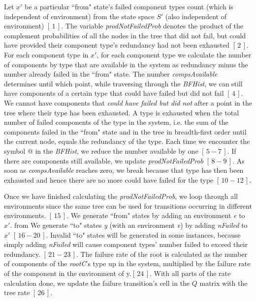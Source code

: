 \documentclass[12pt]{article}
\newcommand{\varName}[1]{\textrm{\it#1}}
\newcommand{\citeLine}[1]{$[\,#1\,]$}
\newcommand{\citeBlock}[2]{$[\,#1 - #2\,]$}
\begin{document}
Let $x'$ be a particular ``from" state's failed component types count (which is independent of environment) from the state space $S'$ (also independent of environment) \citeLine{1}. The variable \textit{prodNotFailedProb} denotes the product of the complement probabilities of all the nodes in the tree that did not fail, but could have provided their component type's redundancy had not been exhausted \citeLine{2}. For each component type in $x'$, for each component type we calculate the number of components by type that are available in the system as redundancy minus the number already failed in the ``from" state. The number \textit{compsAvailable} determines until which point, while traversing through the \textit{BFHist}, we can still have components of a certain type that could have failed but did not fail \citeLine{4}. We cannot have components that \textit{could have failed but did not} after a point in the tree where their type has been exhausted. A type is exhausted when the total number of failed components of the type in the system, i.e. the sum of the components failed in the ``from" state and in the tree in breadth-first order until the current node, equals the redundancy of the type. Each time we encounter the symbol @ in the \textit{BFHist}, we reduce the number available by one \citeBlock{5}{7}. If there are components still available, we update \textit{prodNotFailedProb} \citeBlock{8}{9}. As soon as \textit{compsAvailable} reaches zero, we break because that type has then been exhausted and hence there are no more could have failed for the type \citeBlock{10}{12}.

Once we have finished calculating the \textit{prodNotFailedProb}, we loop through all environments since the same tree can be used for transitions occurring in different environments. \citeLine{15}. We generate ``from" states by adding an environment \textit{e} to $x'$. from We generate ``to" states \textit{y} (with an environment \textit{e}) by adding \textit{nFailed} to $x'$ \citeBlock{16}{20}. Invalid ``to" states will be generated in some instances, because simply adding \textit{nFailed} will cause component types' number failed to exceed their redundancy. \citeBlock{21}{23}. The failure rate of the root is calculated as the number of components of the \varName{rootC}'s type up in the system, multiplied by the failure rate of the component in the environment of y.\citeLine{24}. With all parts of the rate calculation done, we update the failure transition's cell in the $Q$ matrix with the tree rate \citeLine{26}.
\end{document}
